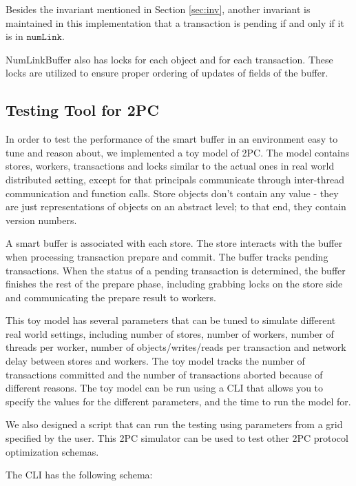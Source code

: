 \documentclass{article}
\begin{document}
Besides the invariant mentioned in Section \ref{sec:inv}, another invariant is 
maintained in this implementation that a transaction is pending if and only if 
it is in $\mathtt{numLink}$.

NumLinkBuffer also has locks for each object and for each transaction. These locks are
utilized to ensure proper ordering of updates of fields of the buffer.



\subsection{Testing Tool for 2PC}
In order to test the performance of the smart buffer in an environment easy to
tune and reason about, we implemented a toy model of 2PC. The model contains
stores, workers, transactions and locks similar to the actual ones in real world
distributed setting, except for that principals communicate through inter-thread
communication and function calls. Store objects don't contain any value - they
are just representations of objects on an abstract level; to that end, they
contain version numbers.

A smart buffer is associated with each store. The store interacts with the
buffer when processing transaction prepare and commit. The buffer tracks pending
transactions. When the status of a pending transaction is determined, the buffer
finishes the rest of the prepare phase, including grabbing locks on the store
side and communicating the prepare result to workers.

This toy model has several parameters that can be tuned to simulate different
real world settings, including number of stores, number of workers, number of
threads per worker, number of objects/writes/reads per transaction and network
delay between stores and workers. The toy model tracks the number of
transactions committed and the number of transactions aborted because of
different reasons. The toy model can be run using a CLI that allows you to
specify the values for the different parameters, and the time to run the model
for.

We also designed a script that can run the testing using parameters from a grid
specified by the user. This 2PC simulator can be used to test other 2PC protocol
optimization schemas.

The CLI has the following schema:
\end{document}
